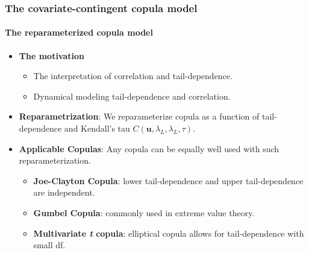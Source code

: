 \documentclass{beamer}
\begin{document}
\begin{frame}
  \frametitle{The covariate-contingent copula model}
  \framesubtitle{The reparameterized copula model}
  \begin{itemize}

  \item \textbf{The motivation}

    \begin{itemize}
    \item The interpretation of correlation and tail-dependence.
    \item Dynamical modeling tail-dependence and correlation.
    \end{itemize}

  \item \textbf{Reparametrization}: We reparameterize copula as a function of
    tail-dependence and Kendall's tau $C(\bm{u},\lambda_L, \lambda_L,\tau)$.
  \item \textbf{Applicable Copulas}: Any copula can be equally well used with such
    reparameterization.

    \begin{itemize}
    \item \textbf{Joe-Clayton Copula}: lower tail-dependence and upper tail-dependence are
      independent.
    \item \textbf{Gumbel Copula}: commonly used in extreme value theory.
    \item \textbf{Multivariate \emph{t} copula}: elliptical copula allows for
      tail-dependence with small df.
    \end{itemize}

  \end{itemize}
\end{frame}
\end{document}
